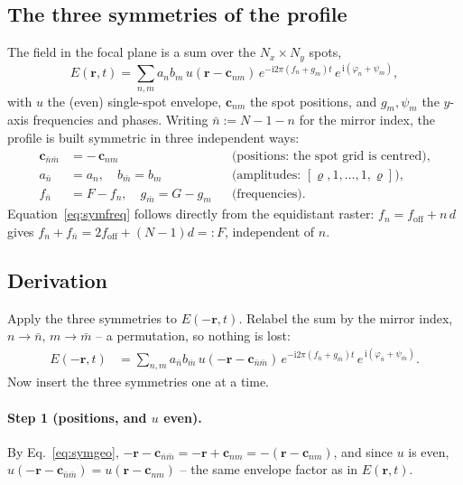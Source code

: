 \documentclass[11pt,a4paper]{article}
\begin{document}
\subsection{The three symmetries of the profile}

The field in the focal plane is a sum over the $N_x\times N_y$ spots,
\begin{equation}
  E(\mathbf r,t) = \sum_{n,m} a_n b_m\,
    u(\mathbf r - \mathbf c_{nm})\,
    e^{-\mathrm{i}2\pi (f_n+g_m)t}\,
    e^{\,\mathrm{i}(\varphi_n+\psi_m)} ,
  \label{eq:field}
\end{equation}
with $u$ the (even) single-spot envelope, $\mathbf c_{nm}$ the spot
positions, and $g_m,\psi_m$ the $y$-axis frequencies and phases. Writing
$\bar n := N-1-n$ for the mirror index, the profile is built symmetric in
three independent ways:
\begin{align}
  \mathbf c_{\bar n\bar m} &= -\,\mathbf c_{nm}
    &&\text{(positions: the spot grid is centred),}\label{eq:symgeo}\\
  a_{\bar n} &= a_n , \quad b_{\bar m} = b_m
    &&\text{(amplitudes: } [\varrho,1,\dots,1,\varrho]\text{),}\label{eq:symamp}\\
  f_{\bar n} &= F - f_n , \quad g_{\bar m} = G - g_m
    &&\text{(frequencies).}\label{eq:symfreq}
\end{align}
Equation~\eqref{eq:symfreq} follows directly from the equidistant raster:
$f_n = f_\mathrm{off}+n\,d$ gives
$f_n + f_{\bar n} = 2f_\mathrm{off} + (N-1)d =: F$, independent of $n$.

\subsection{Derivation}

Apply the three symmetries to $E(-\mathbf r,t)$. Relabel the sum by the
mirror index, $n\to\bar n$, $m\to\bar m$ -- a permutation, so nothing is
lost:
\begin{align}
  E(-\mathbf r,t)
  &= \sum_{n,m} a_{\bar n} b_{\bar m}\,
     u(-\mathbf r - \mathbf c_{\bar n\bar m})\,
     e^{-\mathrm{i}2\pi (f_{\bar n}+g_{\bar m})t}\,
     e^{\,\mathrm{i}(\varphi_{\bar n}+\psi_{\bar m})} .
\end{align}
Now insert the three symmetries one at a time.

\paragraph{Step 1 (positions, and $u$ even).}
By Eq.~\eqref{eq:symgeo}, $-\mathbf r-\mathbf c_{\bar n\bar m}
= -\mathbf r+\mathbf c_{nm} = -(\mathbf r-\mathbf c_{nm})$, and since $u$ is
even, $u(-\mathbf r-\mathbf c_{\bar n\bar m}) = u(\mathbf r-\mathbf c_{nm})$
-- the same envelope factor as in $E(\mathbf r,t)$.
\end{document}
